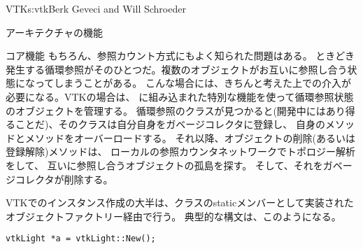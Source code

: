 \begin{aosachapter}{VTK}{s:vtk}{Berk Geveci and Will Schroeder}
\begin{aosasect1}{アーキテクチャの機能}
\begin{aosasect2}{コア機能}
もちろん、参照カウント方式にもよく知られた問題はある。
ときどき発生する循環参照がそのひとつだ。複数のオブジェクトがお互いに参照し合う状態になってしまうことがある。
こんな場合には、きちんと考えた上での介入が必要になる。VTKの場合は、
に組み込まれた特別な機能を使って循環参照状態のオブジェクトを管理する。
循環参照のクラスが見つかると(開発中にはあり得ることだ)、そのクラスは自分自身をガベージコレクタに登録し、
自身のメソッドとメソッドをオーバーロードする。
それ以降、オブジェクトの削除(あるいは登録解除)メソッドは、
ローカルの参照カウンタネットワークでトポロジー解析をして、
互いに参照し合うオブジェクトの孤島を探す。
そして、それをガベージコレクタが削除する。

VTKでのインスタンス作成の大半は、クラスのstaticメンバーとして実装されたオブジェクトファクトリー経由で行う。
典型的な構文は、このようになる。

\begin{verbatim}
vtkLight *a = vtkLight::New();
\end{verbatim}


\end{aosasect2}
\end{aosasect1}
\end{aosachapter}
